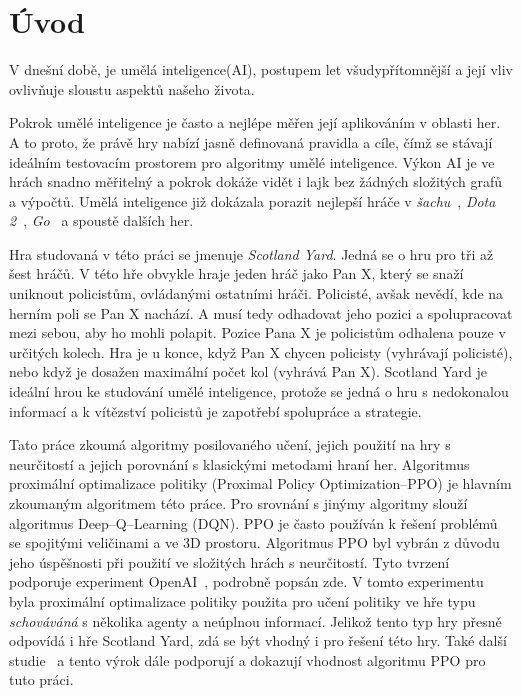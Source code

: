 \newtheorem{definition}{\textbf{Definice}}

\chapter{Úvod}
\label{ch:uvod}

V dnešní době, je umělá inteligence(AI), postupem let všudypřítomnější a její vliv ovlivňuje sloustu aspektů našeho života.

Pokrok umělé inteligence je často a nejlépe měřen její aplikováním v oblasti her.
A to proto, že právě hry nabízí jasně definovaná pravidla a cíle, čímž se stávají ideálním testovacím prostorem pro algoritmy umělé inteligence.
Výkon AI je ve hrách snadno měřitelný a pokrok dokáže vidět i lajk bez žádných složitých grafů a výpočtů.
Umělá inteligence již dokázala porazit nejlepší hráče v \textit{šachu}~\cite{DeepBlue}, \textit{Dota 2}~\cite{Dota2}, \textit{Go}~\cite{AlphaGo} a spoustě dalších her.

Hra studovaná v této práci se jmenuje \emph{Scotland Yard}.
Jedná se o hru pro tři až šest hráčů.
V této hře obvykle hraje jeden hráč jako Pan X, který se snaží uniknout policistům, ovládanými ostatními hráči.
Policisté, avšak nevědí, kde na herním poli se Pan X nachází.
A musí tedy odhadovat jeho pozici a spolupracovat mezi sebou, aby ho mohli polapit.
Pozice Pana X je policistům odhalena pouze v určitých kolech.
Hra je u konce, když Pan X chycen policisty (vyhrávají policisté), nebo když je dosažen maximální počet kol (vyhrává Pan X).
Scotland Yard je ideální hrou ke studování umělé inteligence, protože se jedná o hru s nedokonalou informací a k vítězství policistů je zapotřebí spolupráce a strategie.

Tato práce zkoumá algoritmy posilovaného učení, jejich použití na hry s neurčitostí a jejich porovnání s klasickými metodami hraní her.
Algoritmus proximální optimalizace politiky (Proximal Policy Optimization--PPO) je hlavním zkoumaným algoritmem této práce.
Pro srovnání s jinýmy algoritmy slouží algoritmus Deep--Q--Learning (DQN).
PPO je často používán k řešení problémů se spojitými veličinami a ve 3D prostoru.
Algoritmus PPO byl vybrán z důvodu jeho úspěšnosti při použití ve složitých hrách s neurčitostí.
Tyto tvrzení podporuje experiment OpenAI~\cite{PPO_Hide_Seek_page}, podrobně popsán zde\cite{PPO_Hide_Seek_paper}.
V tomto experimentu byla proximální optimalizace politiky použita pro učení politiky ve hře typu \textit{schováváná} s několika agenty a neúplnou informací.
Jelikož tento typ hry přesně odpovídá i hře Scotland Yard, zdá se být vhodný i pro řešení této hry.
Také další studie~\cite{Manille} a \cite{Dota2} tento výrok dále podporují a dokazují vhodnost algoritmu PPO pro tuto práci.

